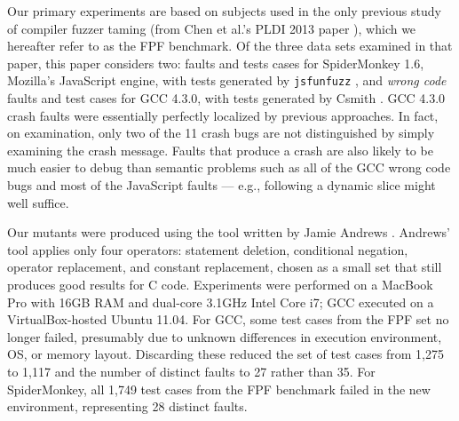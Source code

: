 



Our primary experiments are based on subjects used in the only previous study of compiler fuzzer taming (from Chen et al.'s PLDI 2013 paper \cite{PLDI13}), which we hereafter refer to as the FPF benchmark.  Of the three data sets examined in that paper, this paper considers two:  faults and tests cases for SpiderMonkey 1.6, Mozilla's JavaScript engine, with tests generated by {\tt jsfunfuzz} \cite{jsfunfuzz}, and \emph{wrong code} faults and test cases for GCC 4.3.0, with tests generated by Csmith \cite{csmith}.  GCC 4.3.0 crash faults were essentially perfectly localized by previous approaches.  In fact, on examination, only two of the 11 crash bugs are not distinguished by simply examining the crash message.  Faults that produce a crash are also likely to be much easier to debug than semantic problems such as all of the GCC wrong code bugs and most of the JavaScript faults --- e.g., following a dynamic slice might well suffice.


Our mutants were produced using the tool written by Jamie Andrews \cite{mutant}.  Andrews' tool applies only four operators: statement deletion, conditional negation, operator replacement, and constant replacement, chosen as a small set that still produces good results for C code.  Experiments were performed on a MacBook Pro with 16GB RAM and dual-core 3.1GHz Intel Core i7; GCC executed on a VirtualBox-hosted Ubuntu 11.04.  For GCC, some test cases from the FPF set no longer failed, presumably due to unknown differences in execution environment, OS, or memory layout. Discarding these reduced the set of test cases from 1,275 to 1,117 and the number of distinct faults to 27 rather than 35.  For SpiderMonkey, all 1,749 test cases from the FPF benchmark failed in the new environment, representing 28 distinct faults.

